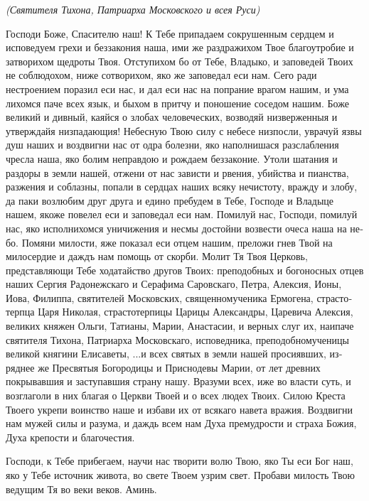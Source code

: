 \itshape (Святителя Тихона, Патриарха Московского и всея  Руси)

\normalfont{}Господи Боже, Спасителю наш! К Тебе припадаем сокрушен­ным сердцем и исповедуем грехи и беззакония наша, ими же раздражихом Твое благоутробие и затворихом щедроты Твоя. Отступихом бо от Тебе, Владыко, и заповедей Твоих не соблюдохом, ниже сотворихом, яко же заповедал еси нам. Сего ради нестроени­ем поразил еси нас, и дал еси нас на попрание врагом нашим, и ума лихомся паче всех язык, и быхом в притчу и поношение соседом нашим. Боже великий и дивный, каяйся о злобах человеческих, возводяй низверженныя и утверждайя низпадающия! Небесную Твою силу с небесе низпосли, уврачуй язвы душ наших и воздвигни нас от одра болезни, яко наполнишася разслабления чресла наша, яко болим неправдою и рождаем беззаконие. Утоли шатания и раздо­ры в земли нашей, отжени от нас зависти и рвения, убийства и пианства, разжения и соблазны, попали в сердцах наших всяку нечистоту, вражду и злобу, да паки возлюбим друг друга и едино пребудем в Тебе, Господе и Владыце нашем, якоже повелел еси и за­поведал еси нам. Помилуй нас, Господи, помилуй нас, яко исполнихомся уничижения и несмы достойни возвести очеса наша на не­бо. Помяни милости, яже показал еси отцем нашим, преложи гнев Твой на милосердие и даждъ нам помощь от скорби. Молит Тя Твоя Церковь, представляющи Тебе ходатайство другов Твоих: преподобных и богоносных отцев наших Сергия Радонежскаго и Серафима Саровскаго, Петра, Алексия, Ионы, Иова, Филиппа, святителей Московских, священномученика Ермогена, страсто­терпца Царя Николая, страстотерпицы Царицы Александры, Царевича Алексия, великих княжен Ольги, Татианы, Марии, Ана­стасии, и верных слуг их, наипаче святителя Тихона, Патриар­ха Московскаго, исповедника, преподобномученицы великой кня­гини Елисаветы, ...и всех святых в земли нашей просиявших, из­ряднее же Пресвятыя Богородицы и Приснодевы Марии, от лет древних покрывавшия и заступавшия страну нашу. Вразуми всех, иже во власти суть, и возглаголи в них благая о Церкви Тво­ей и о всех людех Твоих. Силою Креста Твоего укрепи воинство на­ше и избави их от всякаго навета вражия. Воздвигни нам мужей силы и разума, и даждь всем нам Духа премудрости и страха Божия, Духа крепости и благочестия. 

Господи, к Тебе прибегаем, научи нас творити волю Твою, яко Ты еси Бог наш, яко у Тебе источник живота, во свете Твоем узрим свет. Пробави милость Твою ведущим Тя во веки веков. Аминь. 


\mychapterending